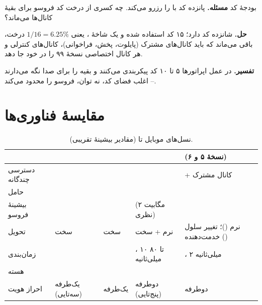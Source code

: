\documentclass[11pt,a4paper]{article}
\begin{document}
\begin{examplebox}{بودجهٔ کد }\label{ex:ovsf}
\textbf{مسئله.}  پانزده کد با  را رزرو می‌کند. چه کسری از درخت کد فروسو برای
بقیهٔ کانال‌ها می‌ماند؟

\textbf{حل.}  شانزده کد دارد؛ ۱۵ کد استفاده شده و یک شاخهٔ ، یعنی
$1/16 = 6.25\%$ درخت، باقی می‌ماند که باید کانال‌های مشترک (پایلوت، پخش، فراخوانی)، کانال‌های کنترلی
 و هر کانال اختصاصی نسخهٔ ۹۹ را در خود جا دهد.

\textbf{تفسیر.} در عمل اپراتورها ۵ تا ۱۰ کد  پیکربندی می‌کنند و بقیه را برای صدا نگه
می‌دارند -- اغلب فضای کد، نه توان، فروسو را محدود می‌کند.
\end{examplebox}

\section{مقایسهٔ فناوری‌ها}
\begin{table}[htbp]
\centering\small
\caption{نسل‌های موبایل تا  (مقادیر بیشینهٔ تقریبی).}\label{tab:gen}
\begin{tabularx}{\linewidth}{@{}l Y Y Y Y@{}}
\toprule
{} &  &  &  &  (نسخهٔ ۵ و ۶) \\
\midrule
دسترسی چندگانه &      &     &        &  + کانال مشترک \\
حامل           &       &      &         &  \\
بیشینهٔ فروسو  &    &   &  (۲ مگابیت نظری) &  \\
تحویل          & سخت                & سخت               & نرم + سخت          & نرم ()؛ تغییر سلول خدمت‌دهنده () \\
زمان‌بندی      &        &       & ، ۱۰ تا ۸۰ میلی‌ثانیه & ، ۲ میلی‌ثانیه \\
هسته           &        &       &   &  \\
احراز هویت     & یک‌طرفه (سه‌تایی)  & یک‌طرفه           &  دوطرفه (پنج‌تایی) &  دوطرفه \\
\bottomrule
\end{tabularx}
\end{table}
\end{document}
